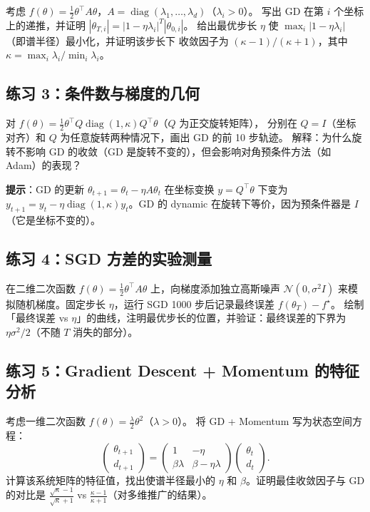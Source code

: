 \documentclass[12pt,a4paper]{ctexart}
\theoremstyle{definition}
\theoremstyle{plain}
\newcommand{\diag}{\operatorname{diag}}
\begin{document}
考虑 $f(\theta) = \frac12\theta^\top A\theta$，$A = \diag(\lambda_1, \ldots, \lambda_d)$（$\lambda_i > 0$）。
写出 GD 在第 $i$ 个坐标上的递推，并证明 $|\theta_{T,i}| = |1 - \eta \lambda_i|^T |\theta_{0,i}|$。
给出最优步长 $\eta$ 使 $\max_i |1 - \eta \lambda_i|$（即谱半径）最小化，并证明该步长下
收敛因子为 $(\kappa - 1)/(\kappa + 1)$，其中 $\kappa = \max_i \lambda_i / \min_i \lambda_i$。

\subsection*{练习 3：条件数与梯度的几何}

对 $f(\theta) = \frac12\theta^\top Q\diag(1,\kappa)Q^\top\theta$（$Q$ 为正交旋转矩阵），
分别在 $Q=I$（坐标对齐）和 $Q$ 为任意旋转两种情况下，画出 GD 的前 10 步轨迹。
解释：为什么旋转不影响 GD 的收敛（GD 是旋转不变的），但会影响对角预条件方法（如 Adam）的表现？

\textbf{提示}：GD 的更新 $\theta_{t+1} = \theta_t - \eta A\theta_t$ 在坐标变换 $y = Q^\top\theta$ 下变为
$y_{t+1} = y_t - \eta \diag(1,\kappa) y_t$。GD 的 dynamic 在旋转下等价，因为预条件器是 $I$（它是坐标不变的）。

\subsection*{练习 4：SGD 方差的实验测量}

在二维二次函数 $f(\theta) = \frac12\theta^\top A\theta$ 上，向梯度添加独立高斯噪声 $\mathcal{N}(0,\sigma^2 I)$
来模拟随机梯度。固定步长 $\eta$，运行 SGD 1000 步后记录最终误差 $f(\theta_T) - f^\star$。
绘制「最终误差 vs $\eta$」的曲线，注明最优步长的位置，并验证：最终误差的下界为 $\eta\sigma^2/2$（不随 $T$ 消失的部分）。

\subsection*{练习 5：Gradient Descent + Momentum 的特征分析}

考虑一维二次函数 $f(\theta) = \frac{\lambda}{2}\theta^2$（$\lambda > 0$）。
将 GD + Momentum 写为状态空间方程：
\begin{equation}
  \begin{pmatrix} \theta_{t+1} \\ d_{t+1} \end{pmatrix}
  = \begin{pmatrix} 1 & -\eta \\ \beta\lambda & \beta - \eta\lambda \end{pmatrix}
  \begin{pmatrix} \theta_t \\ d_t \end{pmatrix}.
\end{equation}
计算该系统矩阵的特征值，找出使谱半径最小的 $\eta$ 和 $\beta$。证明最佳收敛因子与 GD 的对比是
$\frac{\sqrt{\kappa} - 1}{\sqrt{\kappa} + 1}$ vs $\frac{\kappa - 1}{\kappa + 1}$（对多维推广的结果）。
\end{document}
